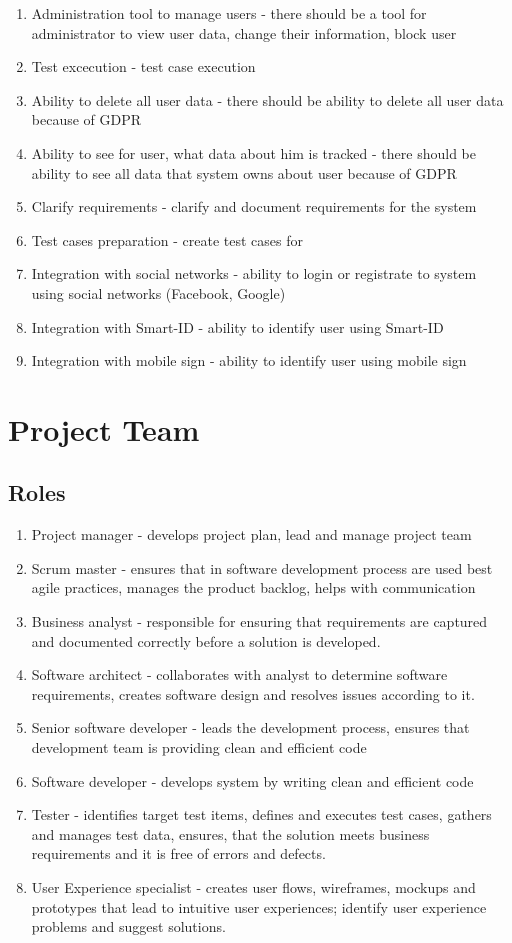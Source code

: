 \documentclass{VUMIFPSkursinis}
\begin{document}
\begin{enumerate}
		\item{Administration tool to manage users} - there should be a tool for administrator to view user data, change their information, block user
		\item{Test excecution} - test case execution
		\item{Ability to delete all user data} - there should be ability to delete all user data because of GDPR
		\item{Ability to see for user, what data about him is tracked} - there should be ability to see all data that system owns about user because of GDPR
		\item{Clarify requirements} - clarify and document requirements for the system
		\item{Test cases preparation} - create test cases for 
		\item{Integration with social networks} - ability to login or registrate to system using social networks (Facebook, Google)
		\item{Integration with Smart-ID} - ability to identify user using Smart-ID
		\item{Integration with mobile sign} - ability to identify user using mobile sign
	\end{enumerate}

\section{Project Team}
	\subsection{Roles}
	\begin{enumerate}
		\item{Project manager} - develops project plan, lead and manage project team
		\item{Scrum master} - ensures that in software development process are used best agile practices, manages the product backlog, helps with communication
		\item{Business analyst} - responsible for ensuring that requirements are captured and documented correctly before a solution is developed.
		\item{Software architect} - collaborates with analyst to determine software requirements, creates software design and resolves issues according to it.
		\item{Senior software developer} - leads the development process, ensures that development team is providing clean and efficient code
		\item{Software developer} - develops system by writing clean and efficient code
		\item{Tester} - identifies target test items, defines and executes test cases, gathers and manages test data, ensures, that the solution meets business requirements and it is free of errors and defects.
		\item{User Experience specialist} - creates user flows, wireframes, mockups and prototypes that lead to intuitive user experiences; identify user experience problems and suggest solutions.
	\end{enumerate}
	
\end{document}
